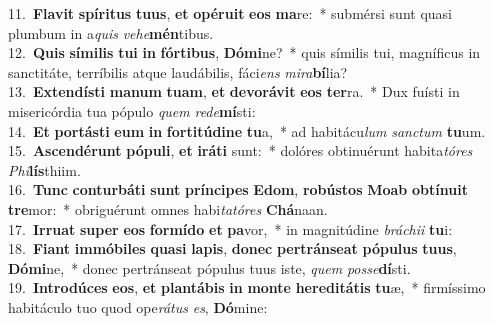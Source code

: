 {11.~}\textbf{Fla}\textbf{vit} \textbf{spí}\textbf{ri}\textbf{tus} \textbf{tu}\textbf{us}, \textbf{et} \textbf{o}\textbf{pé}\textbf{ru}\textbf{it} \textbf{e}\textbf{os} \textbf{ma}re:~* submérsi sunt quasi plumbum in a\textit{quis} \textit{ve}\textit{he}\textbf{mén}tibus.\\
{12.~}\textbf{Quis} \textbf{sí}\textbf{mi}\textbf{lis} \textbf{tu}\textbf{i} \textbf{in} \textbf{fór}\textbf{ti}\textbf{bus}, \textbf{Dó}\textbf{mi}ne?~* quis símilis tui, magníficus in sanctitáte, terríbilis atque laudábilis, fáci\textit{ens} \textit{mi}\textit{ra}\textbf{bí}lia?\\
{13.~}\textbf{Ex}\textbf{ten}\textbf{dí}\textbf{sti} \textbf{ma}\textbf{num} \textbf{tu}\textbf{am}, \textbf{et} \textbf{de}\textbf{vo}\textbf{rá}\textbf{vit} \textbf{e}\textbf{os} \textbf{ter}ra.~* Dux fuísti in misericórdia tua pópulo \textit{quem} \textit{re}\textit{de}\textbf{mí}sti:\\
{14.~}\textbf{Et} \textbf{por}\textbf{tá}\textbf{sti} \textbf{e}\textbf{um} \textbf{in} \textbf{for}\textbf{ti}\textbf{tú}\textbf{di}\textbf{ne} \textbf{tu}a,~* ad habitácu\textit{lum} \textit{san}\textit{ctum} \textbf{tu}um.\\
{15.~}\textbf{A}\textbf{scen}\textbf{dé}\textbf{runt} \textbf{pó}\textbf{pu}\textbf{li}, \textbf{et} \textbf{i}\textbf{rá}\textbf{ti} sunt:~* dolóres obtinuérunt habita\textit{tó}\textit{res} \textit{Phi}\textbf{lís}thiim.\\
{16.~}\textbf{Tunc} \textbf{con}\textbf{tur}\textbf{bá}\textbf{ti} \textbf{sunt} \textbf{prín}\textbf{ci}\textbf{pes} \textbf{E}\textbf{dom}, \textbf{ro}\textbf{bú}\textbf{stos} \textbf{Mo}\textbf{ab} \textbf{ob}\textbf{tí}\textbf{nu}\textbf{it} \textbf{tre}mor:~* obriguérunt omnes habi\textit{ta}\textit{tó}\textit{res} \textbf{Chá}naan.\\
{17.~}\textbf{Ir}\textbf{ru}\textbf{at} \textbf{su}\textbf{per} \textbf{e}\textbf{os} \textbf{for}\textbf{mí}\textbf{do} \textbf{et} \textbf{pa}vor,~* in magnitúdine \textit{brá}\textit{chi}\textit{i} \textbf{tu}i:\\
{18.~}\textbf{Fi}\textbf{ant} \textbf{im}\textbf{mó}\textbf{bi}\textbf{les} \textbf{qua}\textbf{si} \textbf{la}\textbf{pis}, \textbf{do}\textbf{nec} \textbf{per}\textbf{trán}\textbf{se}\textbf{at} \textbf{pó}\textbf{pu}\textbf{lus} \textbf{tu}\textbf{us}, \textbf{Dó}\textbf{mi}ne,~* donec pertránseat pópulus tuus iste, \textit{quem} \textit{pos}\textit{se}\textbf{dí}sti.\\
{19.~}\textbf{In}\textbf{tro}\textbf{dú}\textbf{ces} \textbf{e}\textbf{os}, \textbf{et} \textbf{plan}\textbf{tá}\textbf{bis} \textbf{in} \textbf{mon}\textbf{te} \textbf{he}\textbf{re}\textbf{di}\textbf{tá}\textbf{tis} \textbf{tu}æ,~* firmíssimo habitáculo tuo quod ope\textit{rá}\textit{tus} \textit{es}, \textbf{Dó}mine:\\
